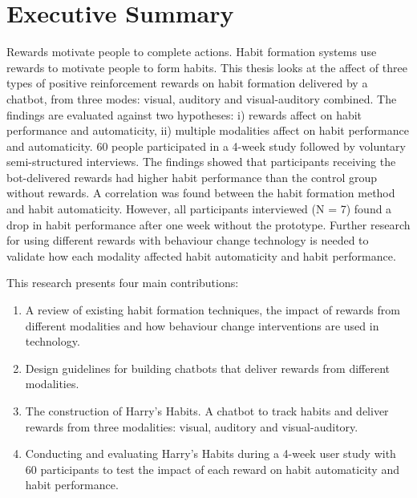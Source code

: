 
\section*{Executive Summary}
Rewards motivate people to complete actions. Habit formation systems use rewards to motivate people to form habits. This thesis looks at the affect of three types of positive reinforcement rewards on habit formation delivered by a chatbot, from three modes: visual, auditory and visual-auditory combined. The findings are evaluated against two hypotheses: i) rewards affect on habit performance and automaticity, ii) multiple modalities affect on habit performance and automaticity. 60 people participated in a 4-week study followed by voluntary semi-structured interviews. The findings showed that participants receiving the bot-delivered rewards had higher habit performance than the control group without rewards. A correlation was found between the habit formation method and habit automaticity. However, all participants interviewed (N = 7) found a drop in habit performance after one week without the prototype. Further research for using different rewards with behaviour change technology is needed to validate how each modality affected habit automaticity and habit performance.


This research presents four main contributions:

\begin{enumerate}
  \item A review of existing habit formation techniques, the impact of rewards from different modalities and how behaviour change interventions are used in technology.
  \item Design guidelines for building chatbots that deliver rewards from different modalities.
  \item The construction of Harry's Habits. A chatbot to track habits and deliver rewards from three modalities: visual, auditory and visual-auditory.
  \item Conducting and evaluating Harry's Habits during a 4-week user study with 60 participants to test the impact of each reward on habit automaticity and habit performance.
\end{enumerate}

\newpage



